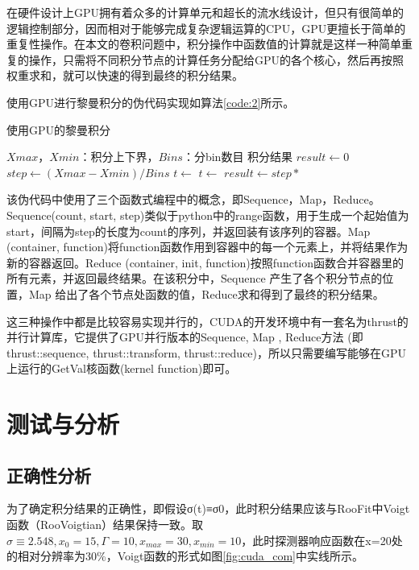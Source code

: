 在硬件设计上GPU拥有着众多的计算单元和超长的流水线设计，但只有很简单的逻辑控制部分，因而相对于能够完成复杂逻辑运算的CPU，GPU更擅长于简单的重复性操作。在本文的卷积问题中，积分操作中函数值的计算就是这样一种简单重复的操作，只需将不同积分节点的计算任务分配给GPU的各个核心，然后再按照权重求和，就可以快速的得到最终的积分结果。

使用GPU进行黎曼积分的伪代码实现如算法\ref{code:2}所示。
\begin{algorithm}  
    \caption{使用GPU的黎曼积分}  
    \begin{algorithmic}[1] 
        \Require 
            $Xmax$，$Xmin$：积分上下界，$Bins$：分bin数目
        \Ensure 
            积分结果
            \State $result \gets 0$  
            \State $step \gets (Xmax - Xmin) / Bins$
            \State $t \gets $
            \State $t \gets $
            \State $result \gets step * $
            \State {}
        \EndFunction

    \end{algorithmic}  
    \label{code:2}
\end{algorithm} 
该伪代码中使用了三个函数式编程中的概念，即Sequence，Map，Reduce。 Sequence(count, start, step)类似于python中的range函数，用于生成一个起始值为start，间隔为step的长度为count的序列，并返回装有该序列的容器。Map (container, function)将function函数作用到容器中的每一个元素上，并将结果作为新的容器返回。Reduce (container, init, function)按照function函数合并容器里的所有元素，并返回最终结果。在该积分中，Sequence 产生了各个积分节点的位置，Map 给出了各个节点处函数的值，Reduce求和得到了最终的积分结果。

这三种操作中都是比较容易实现并行的，CUDA的开发环境中有一套名为thrust的并行计算库\supercite{thrust}，它提供了GPU并行版本的Sequence, Map , Reduce方法 (即 thrust::sequence, thrust::transform, thrust::reduce)，所以只需要编写能够在GPU上运行的GetVal核函数(kernel function)即可。

\section{测试与分析}

\subsection{正确性分析}

为了确定积分结果的正确性，即假设σ(t)≡σ0，此时积分结果应该与RooFit中Voigt函数（RooVoigtian）结果保持一致。取$\sigma \equiv 2.548, x_0=15, \Gamma=10,x_{max}=30,x_{min}=10$，此时探测器响应函数在x=20处的相对分辨率为30\%，Voigt函数的形式如图\ref{fig:cuda_com}中实线所示。

